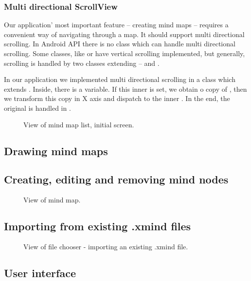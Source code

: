 \subsubsection{Multi directional ScrollView}
\label{subsubsec:action-bar}
Our application' most important feature -- creating mind maps -- requires a convenient way of navigating through a map. It should support multi directional scrolling. In Android API there is no class which can handle multi directional scrolling. Some classes, like  or  have vertical scrolling implemented, but generally, scrolling is handled by two classes extending  --  and . 

In our application we implemented multi directional scrolling in a class  which extends . Inside, there is a  variable. If this inner  is set, we obtain o copy of , then we transform this copy in X axis and dispatch to the inner . In the end, the original  is handled in .

\begin{figure}[h]
	\centering
	\caption{View of mind map list, initial screen.}
	\label{fig:screen-maplist}
\end{figure}

\subsection{Drawing mind maps}
\label{subsec:drawing}

\subsection{Creating, editing and removing mind nodes}
\label{subsec:drawing}

\begin{figure}[h]
	\centering
	\caption{View of mind map.}
	\label{fig:screen-map}
\end{figure}

\subsection{Importing from existing .xmind files}
\label{subsec:import}

\begin{figure}[h]
	\centering
	\caption{View of file chooser - importing an existing .xmind file.}
	\label{fig:screen-filechooser}
\end{figure}


\subsection{User interface}
\label{subsec:ui}
